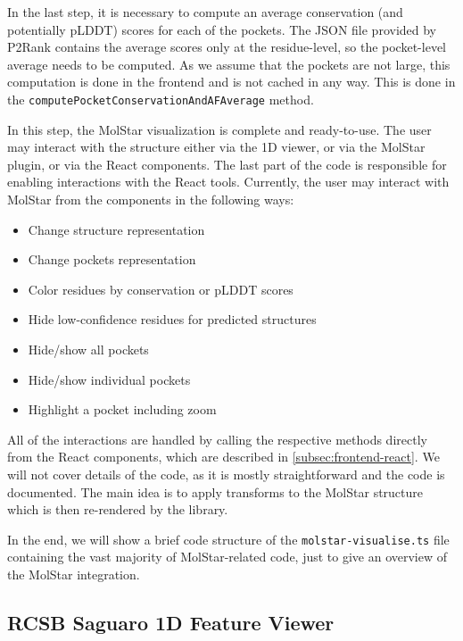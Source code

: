In the last step, it is necessary to compute an average conservation (and potentially pLDDT) scores for each of the pockets. The JSON file provided by P2Rank contains the average scores only at the residue-level, so the pocket-level average needs to be computed. As we assume that the pockets are not large, this computation is done in the frontend and is not cached in any way. This is done in the \texttt{computePocketConservationAndAFAverage} method.

In this step, the MolStar visualization is complete and ready-to-use. The user may interact with the structure either via the 1D viewer, or via the MolStar plugin, or via the React components. The last part of the code is responsible for enabling interactions with the React tools. Currently, the user may interact with MolStar from the components in the following ways:

\begin{itemize}
    \item Change structure representation
    \item Change pockets representation
    \item Color residues by conservation or pLDDT scores
    \item Hide low-confidence residues for predicted structures
    \item Hide/show all pockets
    \item Hide/show individual pockets
    \item Highlight a pocket including zoom
\end{itemize}

All of the interactions are handled by calling the respective methods directly from the React components, which are described in \cref{subsec:frontend-react}. We will not cover details of the code, as it is mostly straightforward and the code is documented. The main idea is to apply transforms to the MolStar structure which is then re-rendered by the library.

In the end, we will show a brief code structure of the \texttt{molstar-visualise.ts} file containing the vast majority of MolStar-related code, just to give an overview of the MolStar integration.




\subsection{RCSB Saguaro 1D Feature Viewer}
\label{subsec:frontend-saguaro}

